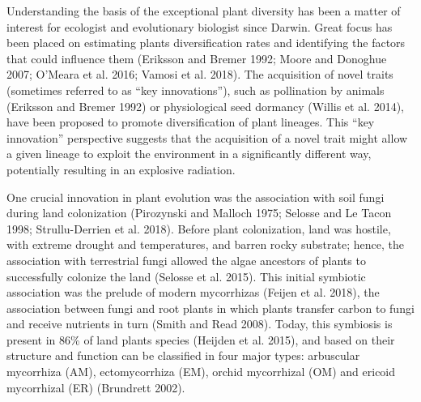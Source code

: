 \documentclass[
  12pt,
]{article}
\begin{document}
Understanding the basis of the exceptional plant diversity has been a
matter of interest for ecologist and evolutionary biologist since
Darwin. Great focus has been placed on estimating plants diversification
rates and identifying the factors that could influence them (Eriksson
and Bremer 1992; Moore and Donoghue 2007; O'Meara et al. 2016; Vamosi et
al. 2018). The acquisition of novel traits (sometimes referred to as
``key innovations''), such as pollination by animals (Eriksson and
Bremer 1992) or physiological seed dormancy (Willis et al. 2014), have
been proposed to promote diversification of plant lineages. This ``key
innovation'' perspective suggests that the acquisition of a novel trait
might allow a given lineage to exploit the environment in a
significantly different way, potentially resulting in an explosive
radiation.

One crucial innovation in plant evolution was the association with soil
fungi during land colonization (Pirozynski and Malloch 1975; Selosse and
Le Tacon 1998; Strullu-Derrien et al. 2018). Before plant colonization,
land was hostile, with extreme drought and temperatures, and barren
rocky substrate; hence, the association with terrestrial fungi allowed
the algae ancestors of plants to successfully colonize the land (Selosse
et al. 2015). This initial symbiotic association was the prelude of
modern mycorrhizas (Feijen et al. 2018), the association between fungi
and root plants in which plants transfer carbon to fungi and receive
nutrients in turn (Smith and Read 2008). Today, this symbiosis is
present in 86\% of land plants species (Heijden et al. 2015), and based
on their structure and function can be classified in four major types:
arbuscular mycorrhiza (AM), ectomycorrhiza (EM), orchid mycorrhizal (OM)
and ericoid mycorrhizal (ER) (Brundrett 2002).
\end{document}

